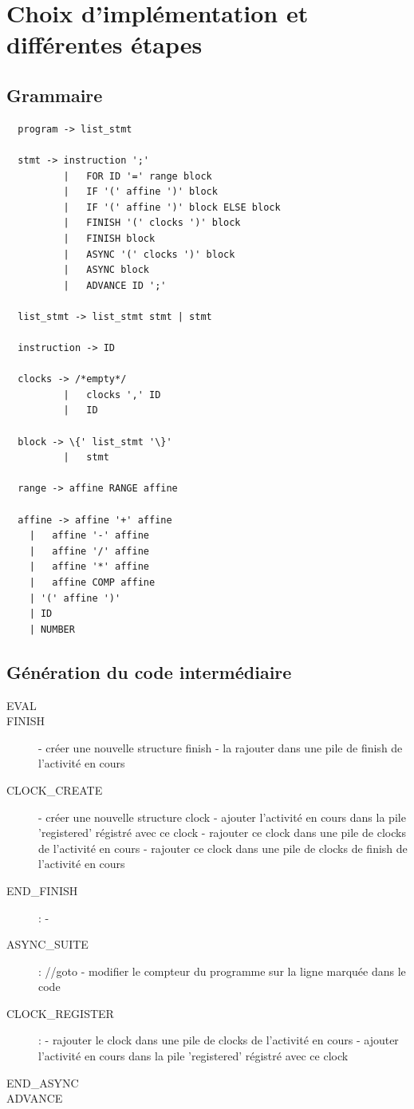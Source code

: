 \documentclass[12pt]{scrartcl}
\begin{document}
\newpage

\section{Choix d'implémentation et différentes étapes}

\subsection{Grammaire}
\begin{lstlisting}
  program -> list_stmt

  stmt -> instruction ';' 
          |   FOR ID '=' range block 
          |   IF '(' affine ')' block  
          |   IF '(' affine ')' block ELSE block
          |   FINISH '(' clocks ')' block
          |   FINISH block
          |   ASYNC '(' clocks ')' block
          |   ASYNC block
          |   ADVANCE ID ';'

  list_stmt -> list_stmt stmt | stmt

  instruction -> ID

  clocks -> /*empty*/
          |   clocks ',' ID
          |   ID

  block -> \{' list_stmt '\}'
          |   stmt

  range -> affine RANGE affine

  affine -> affine '+' affine
    |   affine '-' affine
    |   affine '/' affine
    |   affine '*' affine
    |   affine COMP affine
    | '(' affine ')'
    | ID
    | NUMBER
\end{lstlisting}

\newpage

\subsection{Génération du code intermédiaire}
\begin{description}
  \item[EVAL]

  \item[FINISH]
  - créer une nouvelle structure finish
  - la rajouter dans une pile de finish de l'activité en cours

  \item[CLOCK_CREATE]
  - créer une nouvelle structure clock
  - ajouter l'activité en cours dans la pile 'registered' régistré avec ce clock
  - rajouter ce clock dans une pile de clocks de l'activité en cours
  - rajouter ce clock dans une pile de clocks de finish de l'activité en cours

  \item[END_FINISH]:
  - 
  \item[ASYNC_SUITE]: 
  //goto
  - modifier le compteur du programme sur la ligne marquée dans le code
  \item[CLOCK_REGISTER]:
  - rajouter le clock dans une pile de clocks de l'activité en cours
  - ajouter l'activité en cours dans la pile 'registered'  régistré avec ce clock
  \item [END_ASYNC]   
  \item [ADVANCE]
\end{description}
\end{document}
